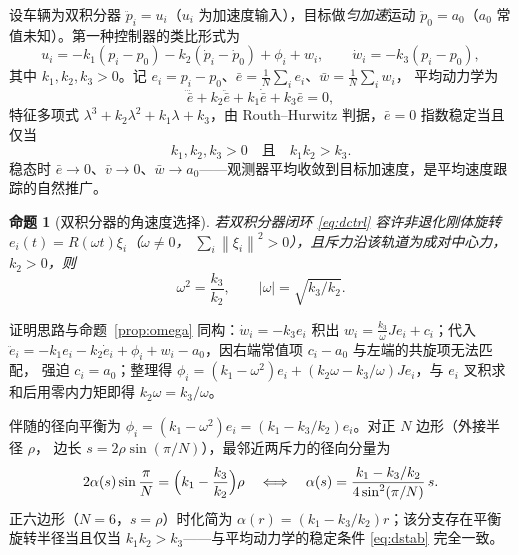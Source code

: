 \documentclass[11pt,a4paper]{ctexart}
\theoremstyle{plain}
\newtheorem{proposition}{命题}
\theoremstyle{definition}
\theoremstyle{remark}
\newcommand{\norm}[1]{\left\|#1\right\|}
\begin{document}
设车辆为双积分器 $\ddot p_i=u_i$（$u_i$ 为加速度输入），目标做\emph{匀加速}运动
$\ddot p_0=a_0$（$a_0$ 常值未知）。第一种控制器的类比形式为
\begin{equation}
  \boxed{\;
  u_i=-k_1(p_i-p_0)-k_2(\dot p_i-\dot p_0)+\phi_i+w_i,\qquad
  \dot w_i=-k_3(p_i-p_0),\;}
  \label{eq:dctrl}
\end{equation}
其中 $k_1,k_2,k_3>0$。记 $e_i=p_i-p_0$、$\bar e=\frac1N\sum_ie_i$、$\bar w=\frac1N\sum_iw_i$，
平均动力学为
\begin{equation}
  \dddot{\bar e}+k_2\ddot{\bar e}+k_1\dot{\bar e}+k_3\bar e=0 ,
  \label{eq:davg}
\end{equation}
特征多项式 $\lambda^3+k_2\lambda^2+k_1\lambda+k_3$，由 Routh--Hurwitz 判据，$\bar e=0$ 指数稳定当且仅当
\begin{equation}
  k_1,k_2,k_3>0\quad\text{且}\quad k_1k_2>k_3 .
  \label{eq:dstab}
\end{equation}
稳态时 $\bar e\to0$、$\bar v\to0$、$\bar w\to a_0$——观测器平均收敛到目标加速度，是平均速度跟踪的自然推广。

\begin{proposition}[双积分器的角速度选择]
\label{prop:domega}
若双积分器闭环 \eqref{eq:dctrl} 容许非退化刚体旋转 $e_i(t)=R(\omega t)\xi_i$（$\omega\ne0$，
$\sum_i\norm{\xi_i}^2>0$），且斥力沿该轨道为成对中心力，$k_2>0$，则
\begin{equation}
  \omega^2=\frac{k_3}{k_2},\qquad |\omega|=\sqrt{k_3/k_2}.
\end{equation}
\end{proposition}
证明思路与命题~\ref{prop:omega} 同构：$\dot w_i=-k_3e_i$ 积出 $w_i=\frac{k_3}{\omega}Je_i+c_i$；代入
$\ddot e_i=-k_1e_i-k_2\dot e_i+\phi_i+w_i-a_0$，因右端常值项 $c_i-a_0$ 与左端的共旋项无法匹配，
强迫 $c_i=a_0$；整理得
$\phi_i=(k_1-\omega^2)e_i+(k_2\omega-k_3/\omega)Je_i$，与 $e_i$ 叉积求和后用零内力矩即得
$k_2\omega=k_3/\omega$。

伴随的径向平衡为 $\phi_i=(k_1-\omega^2)e_i=(k_1-k_3/k_2)e_i$。对正 $N$ 边形（外接半径 $\rho$，
边长 $s=2\rho\sin(\pi/N)$），最邻近两斥力的径向分量为
\begin{equation}
  2\alpha(s)\sin\frac{\pi}{N}=\Bigl(k_1-\frac{k_3}{k_2}\Bigr)\rho
  \quad\Longleftrightarrow\quad
  \alpha(s)=\frac{k_1-k_3/k_2}{4\sin^2(\pi/N)}\,s .
  \label{eq:dalpha}
\end{equation}
正六边形（$N=6$，$s=\rho$）时化简为 $\alpha(r)=(k_1-k_3/k_2)r$；该分支存在平衡旋转半径当且仅当
$k_1k_2>k_3$——与平均动力学的稳定条件 \eqref{eq:dstab} 完全一致。
\end{document}
